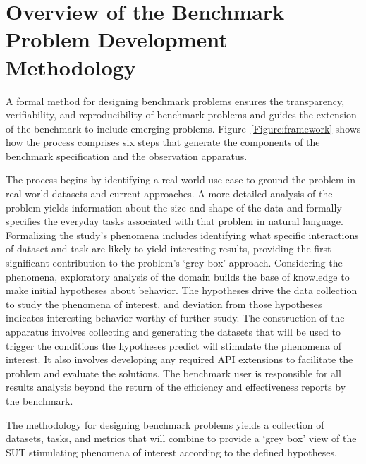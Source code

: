 \section{Overview of the \gai Benchmark Problem Development Methodology}
\label{section:graph-based-ai-problem-methodology}


A formal method for designing benchmark problems ensures the transparency, verifiability, and reproducibility of benchmark problems and guides the extension of the benchmark to include emerging \gai problems. 
Figure~\ref{Figure:framework} shows how the process comprises six steps that generate the components of the benchmark specification and the observation apparatus.

The process begins by identifying a real-world use case to ground the problem in real-world datasets and current approaches. 
A more detailed analysis of the problem yields information about the size and shape of the data and formally specifies the everyday tasks associated with that problem in natural language. 
Formalizing the study's phenomena includes identifying what specific interactions of dataset and task are likely to yield interesting results, providing the first significant contribution to the problem's `grey box' approach. 
Considering the phenomena, exploratory analysis of the domain builds the base of knowledge to make initial hypotheses about behavior. 
The hypotheses drive the data collection to study the phenomena of interest, and deviation from those hypotheses indicates interesting behavior worthy of further study. 
The construction of the apparatus involves collecting and generating the datasets that will be used to trigger the conditions the hypotheses predict will stimulate the phenomena of interest. 
It also involves developing any required \ac{API} extensions to facilitate the problem and evaluate the solutions. 
The benchmark user is responsible for all results analysis beyond the return of the efficiency and effectiveness reports by the benchmark. 

The methodology for designing benchmark problems yields a collection of datasets, tasks, and metrics that will combine to provide a `grey box' view of the \ac{SUT} stimulating phenomena of interest according to the defined hypotheses. 
